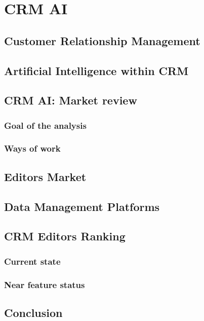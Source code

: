 \chapter{CRM AI}



\section{Customer Relationship Management}
\lipsum[1]


\section{Artificial Intelligence within CRM}
\lipsum[1]


\section{CRM AI: Market review}
\lipsum[1]

\subsection{Goal of the analysis}
\lipsum[2]

\subsection{Ways of work}
\lipsum[3]

\section{Editors Market}
\lipsum[1]

\section{Data Management Platforms}
\lipsum[1]


\section{CRM Editors Ranking}
\lipsum[1]

\subsection{Current state}
\lipsum[2]

\subsection{Near feature status}
\lipsum[3]

\section{Conclusion}
\lipsum[1]
